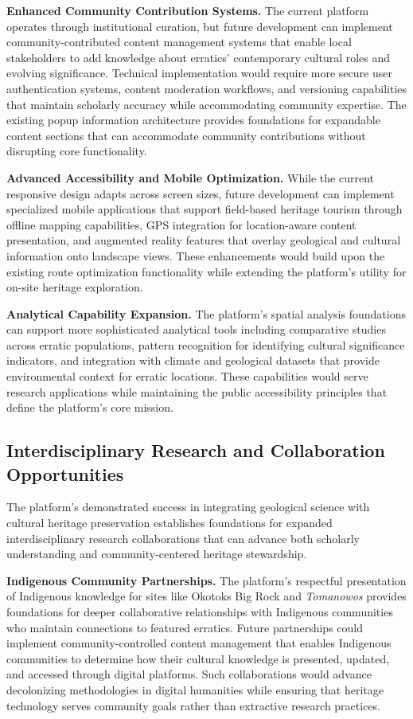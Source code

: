 \textbf{Enhanced Community Contribution Systems.} The current platform operates through institutional curation, but future development can implement community-contributed content management systems that enable local stakeholders to add knowledge about erratics' contemporary cultural roles and evolving significance. Technical implementation would require more secure user authentication systems, content moderation workflows, and versioning capabilities that maintain scholarly accuracy while accommodating community expertise. The existing popup information architecture provides foundations for expandable content sections that can accommodate community contributions without disrupting core functionality.

\textbf{Advanced Accessibility and Mobile Optimization.} While the current responsive design adapts across screen sizes, future development can implement specialized mobile applications that support field-based heritage tourism through offline mapping capabilities, GPS integration for location-aware content presentation, and augmented reality features that overlay geological and cultural information onto landscape views. These enhancements would build upon the existing route optimization functionality while extending the platform's utility for on-site heritage exploration.

\textbf{Analytical Capability Expansion.} The platform's spatial analysis foundations can support more sophisticated analytical tools including comparative studies across erratic populations, pattern recognition for identifying cultural significance indicators, and integration with climate and geological datasets that provide environmental context for erratic locations. These capabilities would serve research applications while maintaining the public accessibility principles that define the platform's core mission.

\subsection{Interdisciplinary Research and Collaboration Opportunities}
\label{subsec:research_opportunities}

The platform's demonstrated success in integrating geological science with cultural heritage preservation establishes foundations for expanded interdisciplinary research collaborations that can advance both scholarly understanding and community-centered heritage stewardship.

\textbf{Indigenous Community Partnerships.} The platform's respectful presentation of Indigenous knowledge for sites like Okotoks Big Rock and \emph{Tomanowos} provides foundations for deeper collaborative relationships with Indigenous communities who maintain connections to featured erratics. Future partnerships could implement community-controlled content management that enables Indigenous communities to determine how their cultural knowledge is presented, updated, and accessed through digital platforms. Such collaborations would advance decolonizing methodologies in digital humanities while ensuring that heritage technology serves community goals rather than extractive research practices.

